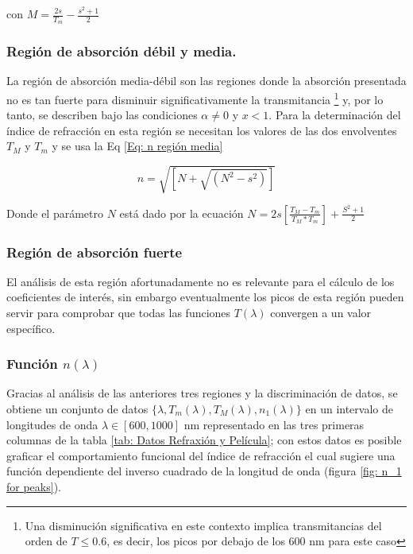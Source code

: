 \documentclass[article]{article}
\begin{document}
\begin{multicols}{2}
        con $M=\frac{2s}{T_m}-\frac{s^2+1}{2}$
    
        \subsubsection{Región de absorción débil y media.}
        
        La región de absorción media-débil son las regiones donde la absorción presentada no es tan fuerte para disminuir significativamente la transmitancia \footnote{Una disminución significativa en este contexto implica transmitancias del orden de $T\leq 0.6$, es decir, los picos por debajo de los $600$ nm para este caso} y, por lo tanto, se describen bajo las condiciones $\alpha\neq0$ y $x<1$. Para la determinación del índice de refracción en esta región se necesitan los valores de las dos envolventes $T_M$ y $T_m$ y se usa la Eq \ref{Eq: n región media}
        
        \begin{equation}
            n=\sqrt{[N+\sqrt{(N^2-s^2)}]}
            \label{Eq: n región media}
        \end{equation}
         
        Donde el parámetro $N$ está dado por la ecuación $N=2s\left[\frac{T_M-T_m}{T_M*T_m}\right]+\frac{S^2+1}{2}$
        
        
        \subsubsection{Región de absorción fuerte}
        
        El análisis de esta región afortunadamente no es relevante para el cálculo de los coeficientes de interés, sin embargo eventualmente los picos de esta región pueden servir para comprobar que todas las funciones $T(\lambda)$ convergen a un valor específico.
        
        
        \subsubsection{Función $n(\lambda)$}
        
        Gracias al análisis de las anteriores tres regiones y la discriminación de datos, se obtiene un conjunto de datos $\{ \lambda, T_m(\lambda), T_M(\lambda), n_1(\lambda)\}$ en un intervalo de longitudes de onda $\lambda\in [600,1000]$ nm representado en las tres primeras columnas de la tabla \ref{tab: Datos Refraxión y Película}; con estos datos es posible graficar el comportamiento funcional del índice de refracción el cual sugiere una función dependiente del inverso cuadrado de la longitud de onda (figura \ref{fig: n_1 for peaks}). 
        

\end{multicols}
\end{document}
